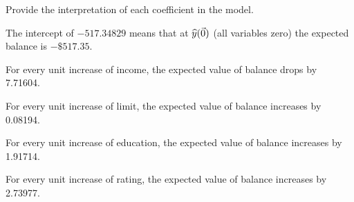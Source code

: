Provide the interpretation of each coefficient in the model.

\soln* The intercept of $-517.34829$ means that at $\widehat{y}(\vec{0})$ (all variables zero) the expected balance is $-\$517.35$.

\nl For every unit increase of income, the expected value of balance drops by 7.71604.

\nl For every unit increase of limit, the expected value of balance increases by 0.08194.

\nl For every unit increase of education, the expected value of balance increases by 1.91714.

\nl For every unit increase of rating, the expected value of balance increases by 2.73977.